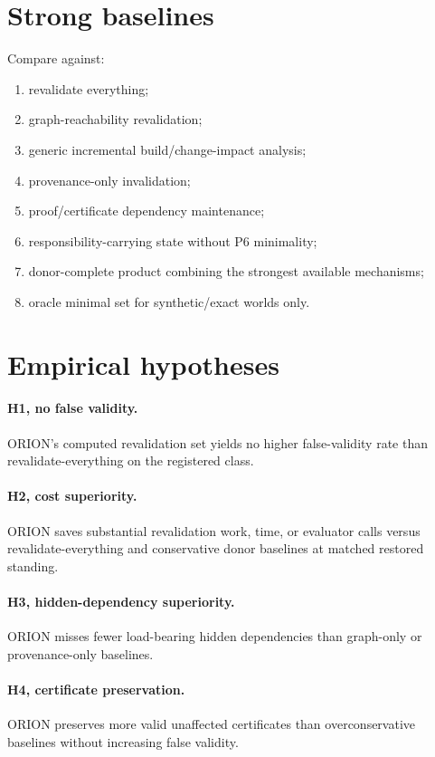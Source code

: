 \documentclass[11pt]{article}
\begin{document}
\section{Strong baselines}
Compare against:
\begin{enumerate}
    \item revalidate everything;
    \item graph-reachability revalidation;
    \item generic incremental build/change-impact analysis;
    \item provenance-only invalidation;
    \item proof/certificate dependency maintenance;
    \item responsibility-carrying state without P6 minimality;
    \item donor-complete product combining the strongest available mechanisms;
    \item oracle minimal set for synthetic/exact worlds only.
\end{enumerate}

\section{Empirical hypotheses}
\paragraph{H1, no false validity.}
ORION's computed revalidation set yields no higher false-validity rate than revalidate-everything on the registered class.

\paragraph{H2, cost superiority.}
ORION saves substantial revalidation work, time, or evaluator calls versus revalidate-everything and conservative donor baselines at matched restored standing.

\paragraph{H3, hidden-dependency superiority.}
ORION misses fewer load-bearing hidden dependencies than graph-only or provenance-only baselines.

\paragraph{H4, certificate preservation.}
ORION preserves more valid unaffected certificates than overconservative baselines without increasing false validity.
\end{document}
